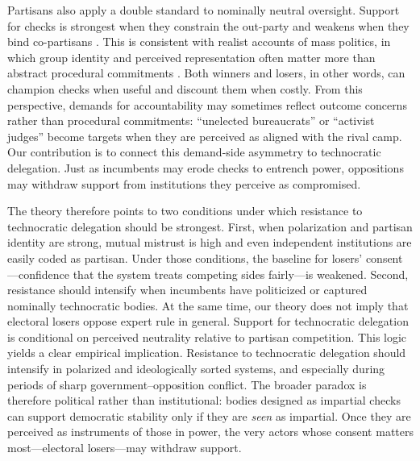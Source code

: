 \documentclass[11pt]{article}\usepackage[]{graphicx}\usepackage[]{xcolor}
\begin{document}
Partisans also apply a double standard to nominally neutral oversight. Support for checks is strongest when they constrain the out-party and weakens when they bind co-partisans \parencite{Svolik2019, Kingzette2021}. This is consistent with realist accounts of mass politics, in which group identity and perceived representation often matter more than abstract procedural commitments \parencite{Achen2016}. Both winners and losers, in other words, can champion checks when useful and discount them when costly. From this perspective, demands for accountability may sometimes reflect outcome concerns rather than procedural commitments: ``unelected bureaucrats'' or ``activist judges'' become targets when they are perceived as aligned with the rival camp. Our contribution is to connect this demand-side asymmetry to technocratic delegation. Just as incumbents may erode checks to entrench power, oppositions may withdraw support from institutions they perceive as compromised.%

The theory therefore points to two conditions under which resistance to technocratic delegation should be strongest. First, when polarization and partisan identity are strong, mutual mistrust is high and even independent institutions are easily coded as partisan. Under those conditions, the baseline for losers' consent---confidence that the system treats competing sides fairly---is weakened. Second, resistance should intensify when incumbents have politicized or captured nominally technocratic bodies. At the same time, our theory does not imply that electoral losers oppose expert rule in general. Support for technocratic delegation is conditional on perceived neutrality relative to partisan competition. This logic yields a clear empirical implication. Resistance to technocratic delegation should intensify in polarized and ideologically sorted systems, and especially during periods of sharp government--opposition conflict. The broader paradox is therefore political rather than institutional: bodies designed as impartial checks can support democratic stability only if they are \emph{seen} as impartial. Once they are perceived as instruments of those in power, the very actors whose consent matters most---electoral losers---may withdraw support.


\end{document}
